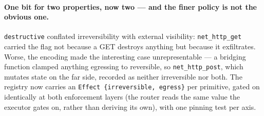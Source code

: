\documentclass[11pt]{article}
\newcommand{\code}[1]{\texttt{#1}}
\begin{document}
\paragraph{One bit for two properties, now two --- and the finer policy is not
the obvious one.} \code{destructive} conflated irreversibility with external
visibility: \code{net\_http\_get} carried the flag not because a GET destroys
anything but because it exfiltrates. Worse, the encoding made the interesting
case unrepresentable --- a bridging function clamped anything egressing to
reversible, so \code{net\_http\_post}, which mutates state on the far side,
recorded as neither irreversible nor both. The registry now carries an
\code{Effect \{irreversible, egress\}} per primitive, gated on identically at
both enforcement layers (the router reads the same value the executor gates on,
rather than deriving its own), with one pinning test per axis.
\end{document}
